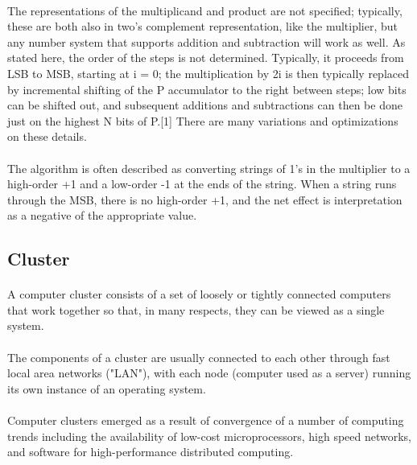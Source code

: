 \documentclass[10pt,a4paper]{article}
\begin{document}
	\paragraph{} The representations of the multiplicand and product are not specified; typically, these are both also in two's complement representation, like the multiplier, but any number system that supports addition and subtraction will work as well. As stated here, the order of the steps is not determined. Typically, it proceeds from LSB to MSB, starting at i = 0; the multiplication by 2i is then typically replaced by incremental shifting of the P accumulator to the right between steps; low bits can be shifted out, and subsequent additions and subtractions can then be done just on the highest N bits of P.[1] There are many variations and optimizations on these details.
	\paragraph{} The algorithm is often described as converting strings of 1's in the multiplier to a high-order +1 and a low-order -1 at the ends of the string. When a string runs through the MSB, there is no high-order +1, and the net effect is interpretation as a negative of the appropriate value.
		
	\subsection{Cluster}
	\paragraph{} A computer cluster consists of a set of loosely or tightly connected computers that work together so that, in many respects, they can be viewed as a single system. 
	
	\paragraph{} The components of a cluster are usually connected to each other through fast local area networks ("LAN"), with each node (computer used as a server) running its own instance of an operating system. 
	
	\paragraph{} Computer clusters emerged as a result of convergence of a number of computing trends including the availability of low-cost microprocessors, high speed networks, and software for high-performance distributed computing. 
	
\end{document}
